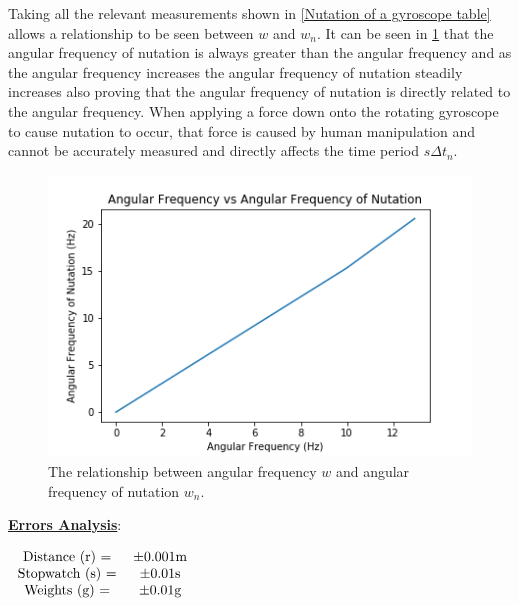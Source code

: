 \documentclass[12pt]{article}
\begin{document}
Taking all the relevant measurements shown in \cref{Nutation of a gyroscope table} allows a relationship to be seen between $w$ and $w_n$. It can be seen in \cref{Nutation comparison} that the angular frequency of nutation is always greater than the angular frequency and as the angular frequency increases the angular frequency of nutation steadily increases also proving that the angular frequency of nutation is directly related to the angular frequency. When applying a force down onto the rotating gyroscope to cause nutation to occur, that force is caused by human manipulation and cannot be accurately measured and directly affects the time period $s{\Delta}t_n$.\\

\begin{figure}[H]
\centering
\includegraphics[scale=0.6]{Images/AngularFrequencyvsFrequencyofNutation.png}
\caption{The relationship between angular frequency $w$ and angular frequency of nutation $w_n$.}
\label{Nutation comparison}
\end{figure}

\textbf{\underline{Errors Analysis}}: \\
\begin{table}[H]
\begin{center}
 \begin{math}
 \begin{tabular}{c c c}
 Distance (r)  = & $\pm$0.001m \\
 Stopwatch (s) = & $\pm$0.01s \\
 Weights (g) = & $\pm$0.01g \\
 \end{tabular}
 \end{math}
 \caption{Nutation of a Gyroscope Error Analysis.}
 \label{3 Error Analysis}
\end{center}
\end{table}
\end{document}
